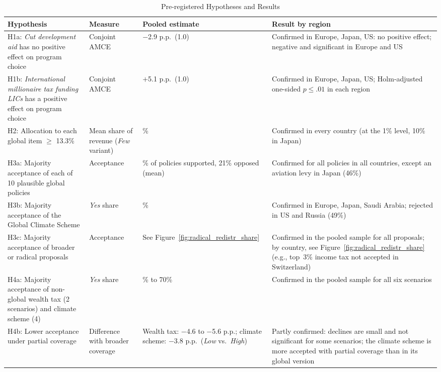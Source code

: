 \documentclass[12pt,english]{article}
\begin{document}
\begin{table}[!tbp]
\centering
\caption{Pre-registered Hypotheses and Results}\label{tab:prereg}
\footnotesize
\begin{tabularx}{\textwidth}{@{}>{\raggedright\arraybackslash}p{4.3cm}>{\raggedright\arraybackslash}p{2.5cm}>{\raggedright\arraybackslash}p{2.9cm}>{\raggedright\arraybackslash}X@{}}
\toprule
Hypothesis & Measure & Pooled estimate & Result by region \\
\midrule
H1a: \textit{Cut development aid} has no positive effect on program choice & Conjoint AMCE & $-$2.9 p.p.\ (1.0) & Confirmed in Europe, Japan, US: no positive effect; negative and significant in Europe and US \\[2pt]
H1b: \textit{International millionaire tax funding LICs} has a positive effect on program choice & Conjoint AMCE & $+$5.1 p.p.\ (1.0) & Confirmed in Europe, Japan, US; Holm-adjusted one-sided $p \leq .01$ in each region \\[2pt]
H2: Allocation to each global item $\geq$ 13.3\% & Mean share of revenue (\textit{Few} variant) & 17.5\% & Confirmed in every country (at the 1\% level, 10\% in Japan) \\[2pt]
H3a: Majority acceptance of each of 10 plausible global policies & Acceptance & 51\% of policies supported, 21\% opposed (mean) & Confirmed for all policies in all countries, except an aviation levy in Japan (46\%) \\[2pt]
H3b: Majority acceptance of the Global Climate Scheme & \textit{Yes} share & 55\% & Confirmed in Europe, Japan, Saudi Arabia; rejected in US and Russia (49\%) \\[2pt]
H3c: Majority acceptance of broader or radical proposals & Acceptance & See Figure~\ref{fig:radical_redistr_share} & Confirmed in the pooled sample for all proposals; by country, see Figure~\ref{fig:radical_redistr_share} (e.g., top~3\% income tax not accepted in Switzerland) \\[2pt]
H4a: Majority acceptance of non-global wealth tax (2 scenarios) and climate scheme (4) & \textit{Yes} share & 61\% to 70\% & Confirmed in the pooled sample for all six scenarios \\[2pt]
H4b: Lower acceptance under partial coverage & Difference with broader coverage & Wealth tax: $-$4.6 to $-$5.6 p.p.; climate scheme: $-$3.8 p.p.\ (\textit{Low} vs.\ \textit{High}) & Partly confirmed: declines are small and not significant for some scenarios; the climate scheme is more accepted with partial coverage than in its global version \\[2pt]

\end{tabularx}
\end{table}
\end{document}
